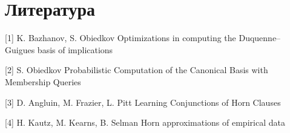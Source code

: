 \newpage
\section{Литература}

[1] K. Bazhanov, S. Obiedkov Optimizations in computing the Duquenne–Guigues basis of implications

[2] S. Obiedkov Probabilistic Computation of the Canonical Basis with Membership Queries

[3] D. Angluin, M. Frazier, L. Pitt Learning Conjunctions of Horn Clauses

[4] H. Kautz, M. Kearns, B. Selman Horn approximations of empirical data